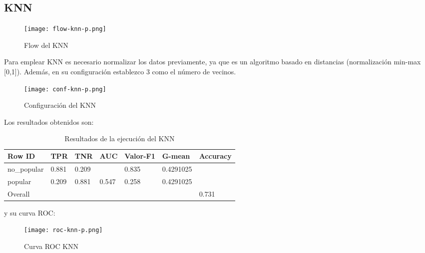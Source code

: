 \subsection{KNN}

\begin{figure}[H] %
	\centering
	\texttt{[image: flow-knn-p.png]}  %
	\caption{Flow del KNN} 
	\label{fig:flow-knn}
\end{figure}

Para emplear KNN es necesario normalizar los datos previamente, ya que es un algoritmo basado en distancias (normalización min-max [0,1]). Además, en su configuración establezco 3 como el número de vecinos.

\begin{figure}[H] %
	\centering
	\texttt{[image: conf-knn-p.png]}  %
	\caption{Configuración del KNN} 
	\label{fig:conf-knn-p}
\end{figure}

Los resultados obtenidos son:

\begin{table}[H]
	\centering
	\begin{tabular}{|l|l|l|l|l|l|l|}
		\hline
		Row ID      & TPR   & TNR   & AUC   & Valor-F1 & G-mean    & Accuracy \\ \hline
		no\_popular & 0.881 & 0.209 &       & 0.835    & 0.4291025 &          \\ \hline
		popular     & 0.209 & 0.881 & 0.547 & 0.258    & 0.4291025 &          \\ \hline
		Overall     &       &       &       &          &           & 0.731    \\ \hline
	\end{tabular}
	\caption{Resultados de la ejecución del KNN}
	\label{tab:knn}
\end{table}

y su curva ROC:

\begin{figure}[H] %
	\centering
	\texttt{[image: roc-knn-p.png]}  %
	\caption{Curva ROC KNN} 
	\label{fig:rocknn-p}
\end{figure}

